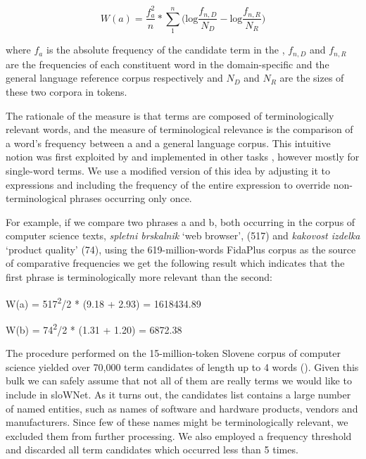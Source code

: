 \documentclass[output=paper]{LSP/langsci}
\begin{document}
$$
{W(a)=\frac{f_{{a}}^{{2}}}{n}\ast \overset{{n}}{\underset{{1}}{\sum }}{(\text{log}\frac{f_{{n,D}}}{N_{{D}}}}-\text{log}\frac{f_{{n,R}}}{N_{{R}}})}
$$

\noindent where $f_a$ is the absolute frequency of the candidate term in the , $f_{n,D}$ and $f_{n,R}$ are the frequencies of each constituent word in the domain-specific and the general language reference corpus respectively and $N_D$ and $N_R$ are the sizes of these two corpora in tokens. 

The rationale of the  measure is that terms are composed of terminologically relevant words, and the measure of terminological relevance is the comparison of a word's frequency between a  and a general language corpus. This intuitive notion was first exploited by \citet{AhmadEtAl1992} and implemented in other  tasks \citep{Scott1998, HeidEtAl2001}, however mostly for single-word terms. We use a modified version of this idea by adjusting it to  expressions and including the frequency of the entire expression to override non-terminological phrases occurring only once. 

For example, if we compare two phrases a and b, both occurring in the corpus of computer science texts, \textit{spletni brskalnik} `web browser', (517) and \textit{kakovost izdelka} `product quality' (74), using the 619-million-words FidaPlus corpus as the source of comparative frequencies we get the following result which indicates that the first phrase is terminologically more relevant than the second:

\ea
\label{vintarfiser:ex:a}
W(a) = 517\textsuperscript{2}/2 * (9.18 + 2.93) = 1618434.89
\z

\ea
\label{vintarfiser:ex:b}
W(b) = 74\textsuperscript{2}/2 * (1.31 + 1.20) = 6872.38
\z

The  procedure performed on the 15-million-token Slovene corpus of computer science yielded over 70,000 term candidates of length up to 4 words (). Given this bulk we can safely assume that not all of them are really terms we would like to include in sloWNet. As it turns out, the candidates list contains a large number of named entities, such as names of software and hardware products, vendors and manufacturers. Since few of these names might be terminologically relevant, we excluded them from further processing. We also employed a frequency threshold and discarded all term candidates which occurred less than 5 times. 
\end{document}
